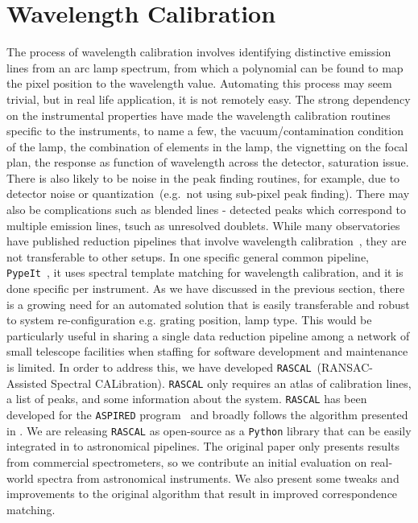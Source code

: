 \documentclass{aa}
\begin{document}
\section{Wavelength Calibration}
The process of wavelength calibration involves identifying distinctive emission lines
from an arc lamp spectrum, from which a polynomial can be found to map the pixel
position to the wavelength value. Automating this process may seem trivial, but in
real life application, it is not remotely easy. The strong dependency on the 
instrumental properties have made the wavelength calibration routines specific to
the instruments, to name a few, the vacuum/contamination condition of the lamp, the 
combination of elements in the lamp, the vignetting on the focal plan, the response
as function of wavelength across the detector, saturation issue. There is also likely
to be noise in the peak finding routines, for example, due to detector noise or
quantization~(e.g.\ not using sub-pixel peak finding). There may also be complications
such as blended lines - detected peaks which correspond to multiple emission lines,
tsuch as unresolved doublets. While many observatories have published reduction
pipelines that involve wavelength calibration~\citep{2002AJ....123..485S,
2012ascl.soft03003C, 2013ApJS..208....5N}, they are not transferable to other setups.
In one specific general common pipeline, \texttt{PypeIt}~\citep{2020JOSS....5.2308P},
it uses spectral template matching for wavelength calibration, and it is done specific
per instrument. As we have discussed in the previous section, there is a growing need
for an automated solution that is easily transferable and robust to system 
re-configuration e.g. grating position, lamp type. This would be particularly
useful in sharing a single data reduction pipeline among a network of small telescope
facilities when staffing for software development and maintenance is limited.
In order to address this, we have developed \texttt{RASCAL}~(RANSAC-Assisted Spectral CALibration).
\texttt{RASCAL} only requires an atlas of calibration lines, a list of peaks, and some information
about the system. \texttt{RASCAL} has been developed for the \texttt{ASPIRED}
program~\citep{2019arXiv191205885L, 2020arXiv201203505L, 2020zndo...4306065L}
and broadly follows the algorithm presented in \citet{2018ApOpt..57.6876S}. We are
releasing \texttt{RASCAL} as open-source as a \texttt{Python} library that can be easily integrated in to
astronomical pipelines. The original paper only presents results from commercial
spectrometers, so we contribute an initial evaluation on real-world spectra
from astronomical instruments. We also present some tweaks and improvements to the
original algorithm that result in improved correspondence matching.
\end{document}
